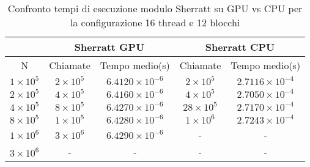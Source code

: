 \begin{table}[ht!]
    \begin{center}
        \renewcommand{\arraystretch}{1.5}
        \begin{adjustbox}{width=.65\textwidth}
            \begin{tabular}{ |c|c|c|c|c| }
                \hline
                \multicolumn{1}{|c}{} & \multicolumn{2}{|c}{Sherratt GPU} & \multicolumn{2}{|c|}{Sherratt CPU} \\
                \hline
                N & Chiamate & Tempo medio(s) & Chiamate & Tempo medio(s) \\
                \hline 
                $1 \times 10^5$ & $2 \times 10^{5}$ & $6.4120 \times 10^{-6}$  & $2 \times 10^{5}$ & $2.7116 \times 10^{-4}$ \\
                \hline 
                $2 \times 10^5$ & $4 \times 10^{5}$ & $6.4160 \times 10^{-6}$  & $4 \times 10^{5}$ & $2.7050 \times 10^{-4}$ \\
                \hline 
                $4 \times 10^5$ & $8 \times 10^{5}$ & $6.4270 \times 10^{-6}$  & $28 \times 10^{5}$ & $2.7170 \times 10^{-4}$ \\
                \hline 
                $8 \times 10^5$ & $1 \times 10^{5}$ & $6.4280 \times 10^{-6}$  & $1 \times 10^{6}$ & $2.7243 \times 10^{-4}$ \\
                \hline 
                $1 \times 10^6$ & $3 \times 10^{6}$ & $6.4290 \times 10^{-6}$  & - & - \\ 
                \hline
                $3 \times 10^6$ & - & - & - & - \\
                \hline
            \end{tabular}
        \end{adjustbox}
    \end{center}
    \caption{Confronto tempi di esecuzione modulo Sherratt su GPU vs CPU per la configurazione 16 thread e 12 blocchi}
    \label{tab:sherratt_kernel_table_16x12}
\end{table}


